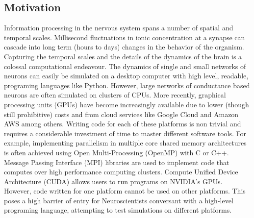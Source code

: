 \documentclass[10pt,letterpaper]{article}
\begin{document}


\linenumbers

\begin{nolinenumbers}
\section*{Motivation}
Information processing in the nervous system spans a number of spatial and temporal scales. Millisecond fluctuations in ionic concentration at a synapse can cascade into long term (hours to days) changes in the behavior of the organism. Capturing the temporal scales and the details of the dynamics of the brain is a colossal computational endeavour. The dynamics of single and small networks of neurons can easily be simulated on a desktop computer with high level, readable, programing languages like Python. However, large networks of conductance based neurons are often simulated on clusters of CPUs. More recently, graphical processing units (GPUs) have become increasingly available due to lower (though still prohibitive) costs and from cloud services like Google Cloud and Amazon AWS among others. Writing code for each of these platforms is non trivial and requires a considerable investment of time to master different software tools. For example, implementing parallelism in multiple core shared memory architectures is often achieved using Open Multi-Processing (OpenMP) with C or C++. Message Passing Interface (MPI) libraries are used to implement code that computes over high performance computing clusters. Compute Unified Device Architecture (CUDA) allows users to run programs on NVIDIA's GPUs. However, code written for one platform cannot be used on other platforms. This poses a high barrier of entry for Neuroscientists conversant with a high-level programing language, attempting to test simulations on different platforms. 


\end{nolinenumbers}
\end{document}
